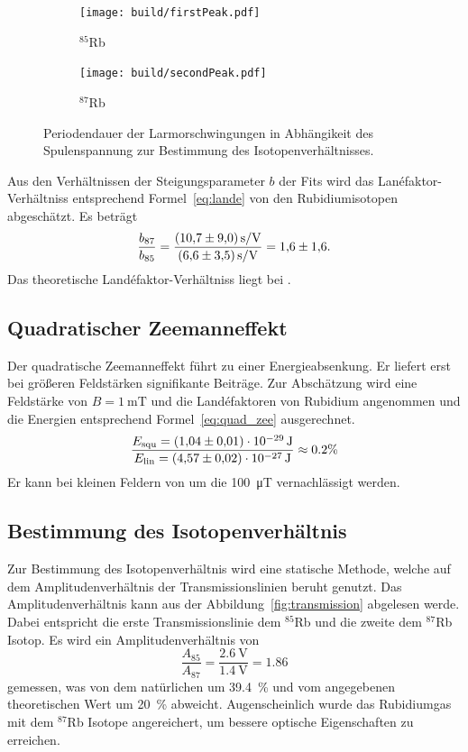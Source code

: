 \begin{figure}[h]
	\centering
	\begin{subfigure}[c]{0.45\textwidth}
	\begin{center}
		\texttt{[image: build/firstPeak.pdf]}
	\end{center}
	\caption{$^{85}$Rb}%
	\label{fig:}
	\end{subfigure}
	\begin{subfigure}[c]{0.45\textwidth}
	\begin{center}
	\texttt{[image: build/secondPeak.pdf]}
	\end{center}
	\caption{$^{87}$Rb}%
	\label{fig:}
	\end{subfigure}
	\caption{Periodendauer der Larmorschwingungen in Abhängikeit des
	Spulenspannung zur Bestimmung des Isotopenverhältnisses.}%
	\label{fig:fitexp}
\end{figure}
Aus den Verhältnissen der Steigungsparameter $b$ der Fits wird das
Lan\'efaktor-Verhältniss entsprechend Formel~\ref{eq:lande} von den
Rubidiumisotopen abgeschätzt.
Es beträgt
\begin{equation}
	\frac{b_{87}}{b_{85}} =
	\frac{\SI{10.7+-9.0}{\second\per\volt}}{\SI{6.6+-3.5}{\second\per\volt}} =
	\num{1.6 +- 1.6}.
\end{equation}
Das theoretische Land\'efaktor-Verhältniss liegt bei .

\subsection{Quadratischer Zeemanneffekt}%
\label{sub:quadratischer_zeemanneffekt}
Der quadratische Zeemanneffekt führt zu einer Energieabsenkung.
Er liefert erst bei größeren Feldstärken signifikante Beiträge.
Zur Abschätzung wird eine Feldstärke von $B=\SI{1}{\milli\tesla}$
und die Land\'efaktoren von Rubidium angenommen und die Energien entsprechend
Formel~\ref{eq:quad_zee} ausgerechnet.
\begin{equation}
	\frac{E_\text{squ} = \SI{1.04 +- 0.01e-29}{\joule}}{E_\text{lin} =
		\SI{4.57 +- 0.02e-27}{\joule}} \approx 0.2 \%
\end{equation}
Er kann bei kleinen Feldern von um die \SI{100}{\micro\tesla} vernachlässigt werden.

\subsection{Bestimmung des Isotopenverhältnis}%
\label{sub:bestimmung_des_isotopenverhaeltniss}
Zur Bestimmung des Isotopenverhältnis wird eine statische Methode,
welche auf dem Amplitudenverhältnis der Transmissionslinien beruht genutzt.
Das Amplitudenverhältnis kann aus der Abbildung~\ref{fig:transmission} abgelesen werde.
Dabei entspricht die erste Transmissionslinie dem $^{85}$Rb und die zweite dem
$^{87}$Rb Isotop.
Es wird ein Amplitudenverhältnis von
\begin{equation}
	\frac{A_{85}}{A_{87}} = \frac{\SI{2.6}{\volt}}{\SI{1.4}{\volt}} = \num{1.86}
\end{equation}
gemessen, was von dem natürlichen um \SI{39.4}{\percent} und vom angegebenen
theoretischen Wert um \SI{20}{\percent} abweicht.
Augenscheinlich wurde das Rubidiumgas mit dem $^{87}$Rb Isotope angereichert,
um bessere optische Eigenschaften zu erreichen.
